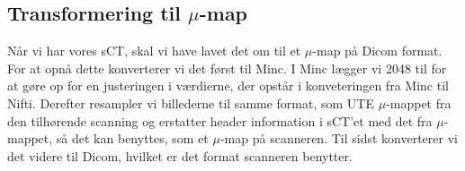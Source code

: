 \subsection{Transformering til $\mu$-map} 

Når vi har vores sCT, skal vi have lavet det om til et $\mu$-map
på Dicom format. For at opnå dette konverterer vi det først til
Minc. I Minc lægger vi 2048 til for at gøre op for en justeringen i
værdierne, der opstår i konveteringen fra Minc til Nifti. Derefter
resampler vi billederne til samme format, som UTE $\mu$-mappet fra den
tilhørende scanning og erstatter header information i sCT'et med det fra
$\mu$-mappet, så det kan benyttes, som et $\mu$-map på scanneren. Til
sidst konverterer vi det videre til Dicom, hvilket er det format scanneren
benytter.









